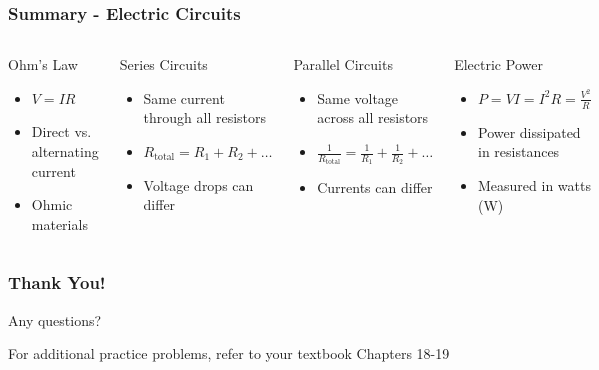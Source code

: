 \documentclass{beamer}
\begin{document}
\begin{frame}
    \frametitle{Summary - Electric Circuits}
    \begin{columns}
        \begin{block}{Ohm's Law}
            \begin{itemize}
                \item $V = IR$
                \item Direct vs. alternating current
                \item Ohmic materials
            \end{itemize}
        \end{block}
        
        \begin{block}{Series Circuits}
            \begin{itemize}
                \item Same current through all resistors
                \item $R_{\text{total}} = R_1 + R_2 + \ldots$
                \item Voltage drops can differ
            \end{itemize}
        \end{block}
        
        \begin{block}{Parallel Circuits}
            \begin{itemize}
                \item Same voltage across all resistors
                \item $\frac{1}{R_{\text{total}}} = \frac{1}{R_1} + \frac{1}{R_2} + \ldots$
                \item Currents can differ
            \end{itemize}
        \end{block}
        
        \begin{block}{Electric Power}
            \begin{itemize}
                \item $P = VI = I^2R = \frac{V^2}{R}$
                \item Power dissipated in resistances
                \item Measured in watts (W)
            \end{itemize}
        \end{block}
    \end{columns}
\end{frame}



\begin{frame}
    \frametitle{Thank You!}
    \begin{center}
        \Large Any questions?
        
        \vspace{1cm}
        
        \normalsize For additional practice problems, refer to your textbook Chapters 18-19
    \end{center}
\end{frame}
\end{document}
